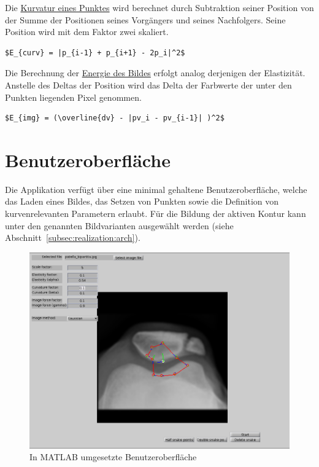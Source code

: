 Die \underline{Kurvatur eines Punktes} wird berechnet durch Subtraktion seiner Position von der Summe der Positionen seines Vorgängers und seines Nachfolgers. Seine Position wird mit dem Faktor zwei skaliert.
\begin{lstlisting}[caption={Berechnung der Kurvatur eines Punktes. $p_i$ stellt die Position eines Punktes $i$ dar.\protect\footnotemark}]
    $E_{curv} = |p_{i-1} + p_{i+1} - 2p_i|^2$
\end{lstlisting}

Die Berechnung der \underline{Energie des Bildes} erfolgt analog derjenigen der Elastizität. Anstelle des Deltas der Position wird das Delta der Farbwerte der unter den Punkten liegenden Pixel genommen.
\begin{lstlisting}[caption={Berechnung der Bildenergie eines Punktes. Es bedeuten: $pv_i$ Farbwert des unter dem Punkt $i$ liegenden Pixels, $\overline{dv}$ mittlere Farbwerte zweier unter den Punkten liegenden Pixel.\protect\footnotemark}]
    $E_{img} = (\overline{dv} - |pv_i - pv_{i-1}| )^2$
\end{lstlisting}

\newpage

\section{Benutzeroberfläche}
\label{sec:realisation:gui}
Die Applikation verfügt über eine minimal gehaltene Benutzeroberfläche, welche das Laden eines Bildes, das Setzen von Punkten sowie die Definition von kurvenrelevanten Parametern erlaubt. Für die Bildung der aktiven Kontur kann unter den genannten Bildvarianten ausgewählt werden (siehe Abschnitt~\ref{subsec:realization:arch}).

\begin{figure}[h!]
    \centering
    \includegraphics[scale=0.5]{images/ownimpl_gui.png}
    \caption{In MATLAB umgesetzte Benutzeroberfläche\protect\footnotemark{}}
\label{fig:ownimpl_gui}
\end{figure}

